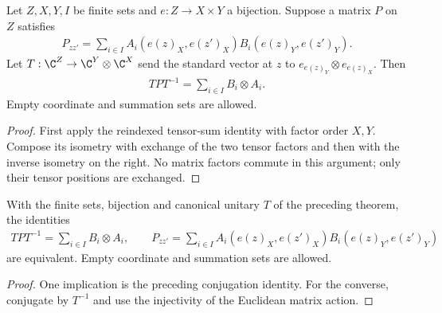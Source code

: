 \begin{theorem}
    \label{thm:middle_first_conjugated_tensor_sum}
    \leanok
    Let $Z,X,Y,I$ be finite sets and $e:Z\to X\times Y$ a bijection.
    Suppose a matrix $P$ on $Z$ satisfies
    \begin{align}
        P_{zz'}=\sum_{i\in I}A_i(e(z)_X,e(z')_X)B_i(e(z)_Y,e(z')_Y).
    \end{align}
    Let $T:\C^Z\to\C^Y\otimes\C^X$ send the standard vector at $z$ to
    $e_{e(z)_Y}\otimes e_{e(z)_X}$. Then
    \begin{align}
        TPT^{-1}=\sum_{i\in I}B_i\otimes A_i.
    \end{align}
    Empty coordinate and summation sets are allowed.
\end{theorem}
\begin{proof}\leanok
    First apply the reindexed tensor-sum identity with factor order $X,Y$.
    Compose its isometry with exchange of the two tensor factors and then
    with the inverse isometry on the right. No matrix factors commute in
    this argument; only their tensor positions are exchanged.
\end{proof}

\begin{lemma}
    \label{lem:middle_first_tensor_sum_iff}
    \leanok
    With the finite sets, bijection and canonical unitary $T$ of the
    preceding theorem, the identities
    \begin{align}
        TPT^{-1}=\sum_{i\in I}B_i\otimes A_i,
        \qquad
        P_{zz'}=\sum_{i\in I}A_i(e(z)_X,e(z')_X)B_i(e(z)_Y,e(z')_Y)
    \end{align}
    are equivalent. Empty coordinate and summation sets are allowed.
\end{lemma}
\begin{proof}\leanok
    One implication is the preceding conjugation identity. For the
    converse, conjugate by $T^{-1}$ and use the injectivity of the
    Euclidean matrix action.
\end{proof}

